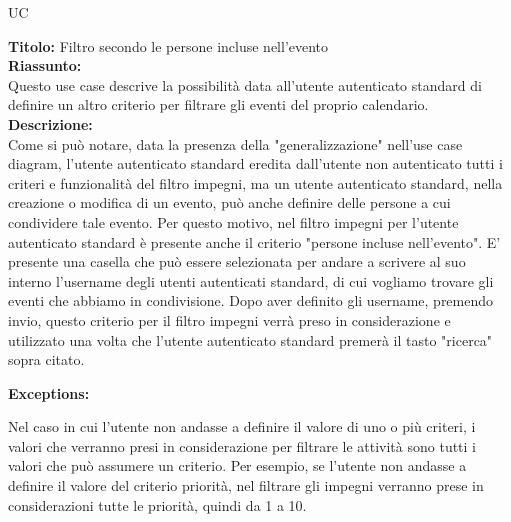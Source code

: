 \begin{listaPersonale}{UC}
\begin{listaPersonale2}[UC] {}
                \textbf{Titolo: } Filtro secondo le persone incluse nell'evento \\
                \textbf{Riassunto: } \\ Questo use case descrive la possibilità data all'utente autenticato standard di definire un altro criterio per filtrare gli eventi del proprio calendario.\\
                \textbf{Descrizione: } \\ Come si può notare, data la presenza della "generalizzazione" nell'use case diagram, l'utente autenticato standard eredita dall'utente non autenticato tutti i criteri e funzionalità del filtro impegni, ma un utente autenticato standard, nella creazione o modifica di un evento, può anche definire delle persone a cui condividere tale evento. Per questo motivo, nel filtro impegni per l'utente autenticato standard è presente anche il criterio "persone incluse nell'evento". E' presente una casella che può essere selezionata per andare a scrivere al suo interno l'username degli utenti autenticati standard, di cui vogliamo trovare gli eventi che abbiamo in condivisione.
                Dopo aver definito gli username, premendo invio, questo criterio per il filtro impegni verrà preso in considerazione e utilizzato una volta che l'utente autenticato standard premerà il tasto "ricerca" sopra citato.

                \textbf{Exceptions:}
                \begin{enumerate}[label=\textbf{[exception \arabic{enumiii}]}, ref= \textbf{[exception \arabic{enumiii}]}]
                     Nel caso in cui l'utente non andasse a definire il valore di uno o più criteri, i valori che verranno presi in considerazione per filtrare le attività sono tutti i valori che può assumere un criterio. Per esempio, se l'utente non andasse a definire il valore del criterio priorità, nel filtrare gli impegni verranno prese in considerazioni tutte le priorità, quindi da 1 a 10.
                \end{enumerate}
    \end{listaPersonale2}





    \begin{center}
        
    \end{center}



\end{listaPersonale}
